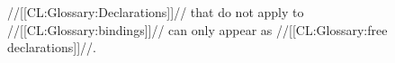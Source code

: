 //[[CL:Glossary:Declarations]]// that do not apply to //[[CL:Glossary:bindings]]// can only appear 
as //[[CL:Glossary:free declarations]]//.




















































































































